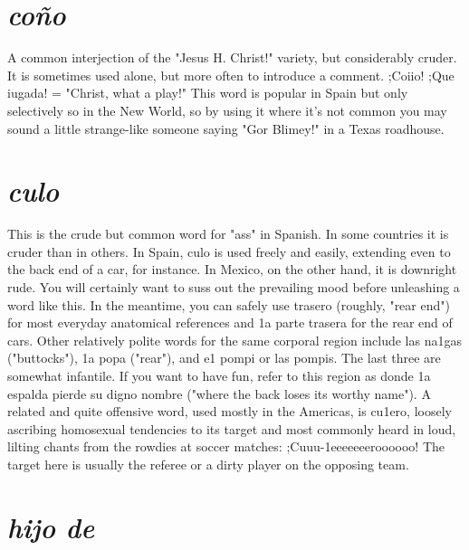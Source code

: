 \documentclass[14pt,a4paper,oneside]{memoir}
\begin{document}
\section{\emph{coño}}

A common interjection of the "Jesus H. Christ!" variety, but
considerably cruder. It is sometimes used alone, but more often to introduce a comment. ;Coiio! ;Que iugada! = "Christ, what a play!"
This word is popular in Spain but only selectively so in the New
World, so by using it where it's not common you may sound a little
strange-like someone saying "Gor Blimey!" in a Texas roadhouse.

\section{\emph{culo}}

This is the crude but common word for "ass" in Spanish. In
some countries it is cruder than in others. In Spain, culo is used freely
and easily, extending even to the back end of a car, for instance. In
Mexico, on the other hand, it is downright rude. You will certainly
want to suss out the prevailing mood before unleashing a word like
this. In the meantime, you can safely use trasero (roughly, "rear end")
for most everyday anatomical references and 1a parte trasera for the
rear end of cars. Other relatively polite words for the same corporal region include las na1gas ("buttocks"), 1a popa ("rear"), and e1 pompi or
las pompis. The last three are somewhat infantile. If you want to have
fun, refer to this region as donde 1a espalda pierde su digno nombre
("where the back loses its worthy name").
A related and quite offensive word, used mostly in the Americas, is cu1ero, loosely ascribing homosexual tendencies to its target
and most commonly heard in loud, lilting chants from the rowdies at
soccer matches: ;Cuuu-1eeeeeeeroooooo! The target here is usually the
referee or a dirty player on the opposing team.

\section{\emph{hijo de}}
\end{document}
